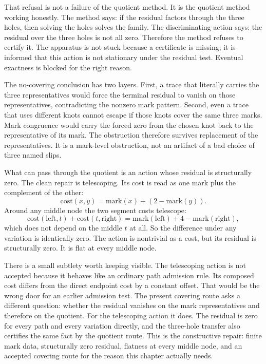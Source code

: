 That refusal is not a failure of the quotient method. It is the quotient method
working honestly. The method says: if the residual factors through the three
holes, then solving the holes solves the family. The discriminating action says:
the residual over the three holes is not all zero. Therefore the method refuses
to certify it. The apparatus is not stuck because a certificate is missing; it is
informed that this action is not stationary under the residual test. Eventual
exactness is blocked for the right reason.

The no-covering conclusion has two layers. First, a trace that literally carries
the three representatives would force the terminal residual to vanish on those
representatives, contradicting the nonzero mark pattern. Second, even a trace that
uses different knots cannot escape if those knots cover the same three marks. Mark
congruence would carry the forced zero from the chosen knot back to the
representative of its mark. The obstruction therefore survives replacement of the
representatives. It is a mark-level obstruction, not an artifact of a bad choice
of three named slips.

What can pass through the quotient is an action whose residual is structurally
zero. The clean repair is telescoping. Its cost is read as one mark plus the
complement of the other:
\[
  \text{cost}(x,y)=\mathrm{mark}(x)+(2-\mathrm{mark}(y)).
\]
Around any middle node the two segment costs telescope:
\[
  \text{cost}(\text{left}, t) + \text{cost}(t, \text{right})
  = \mathrm{mark}(\text{left}) + 4 - \mathrm{mark}(\text{right}),
\]
which does not depend on the middle \(t\) at all. So the difference under any
variation is identically zero. The action is nontrivial as a cost, but its
residual is structurally zero. It is flat at every middle node.

There is a small subtlety worth keeping visible. The telescoping action is not
accepted because it behaves like an ordinary path admission rule. Its composed
cost differs from the direct endpoint cost by a constant offset. That would be
the wrong door for an earlier admission test. The present covering route asks a
different question: whether the residual vanishes on the mark representatives and
therefore on the quotient. For the telescoping action it does. The residual is
zero for every path and every variation directly, and the three-hole transfer
also certifies the same fact by the quotient route. This is the constructive
repair: finite mark data, structurally zero residual, flatness at every middle
node, and an accepted covering route for the reason this chapter actually needs.

